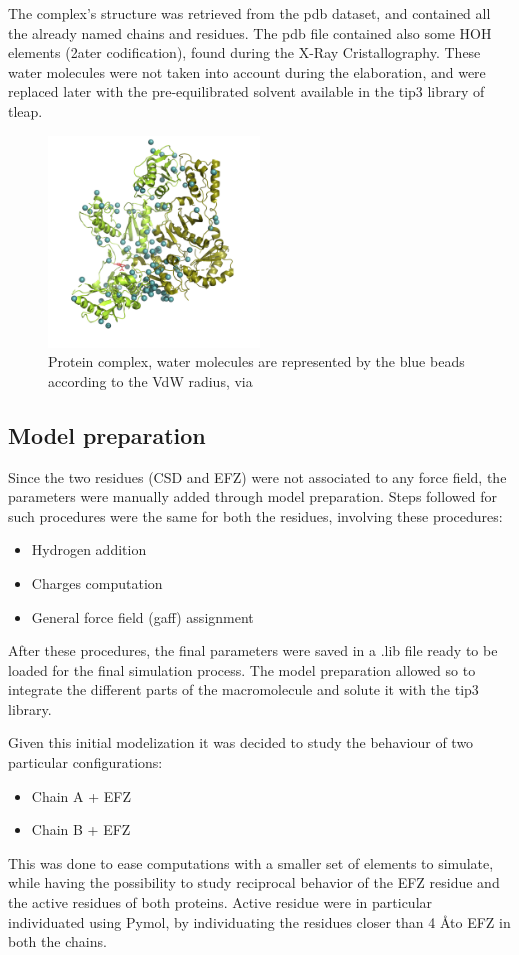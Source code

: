 \documentclass[12pt]{article}
\begin{document}
The complex's structure was retrieved from the pdb dataset, and contained all the already named chains and residues. The pdb file contained also some HOH elements (2ater codification), found during the X-Ray Cristallography\cite{SAKABE1991448}. 
These water molecules were not taken into account during the elaboration, and were replaced later with the pre-equilibrated solvent available in the tip3 library of tleap.
\begin{figure}
    \centering
    \includegraphics[width=0.5\textwidth]{../figures/water.png}
    \caption{Protein complex, water molecules are represented by the blue beads according to the VdW radius, via \cite{pymol} \label{fig:total}}
\end{figure}

\subsection{Model preparation}
Since the two residues (CSD and EFZ) were not associated to any force field, the parameters were manually added through model preparation.
Steps followed for such procedures were the same for both the residues, involving these procedures:

\begin{itemize}
    \item Hydrogen addition
    \item Charges computation
    \item General force field (gaff) assignment
\end{itemize}

After these procedures, the final parameters were saved in a .lib file ready to be loaded for the final simulation process. The model preparation allowed so to integrate the different parts of the macromolecule and solute it with the tip3 library.  

Given this initial modelization it was decided to study the behaviour of two particular configurations:
\begin{itemize}
    \item Chain A + EFZ
    \item Chain B + EFZ
\end{itemize}
This was done to ease computations with a smaller set of elements to simulate, while having the possibility to study reciprocal behavior of the EFZ residue and the active residues of both proteins. Active residue were in particular individuated using Pymol\cite{pymol}, by individuating the residues closer than 4 \AA to EFZ in both the chains.
\end{document}
